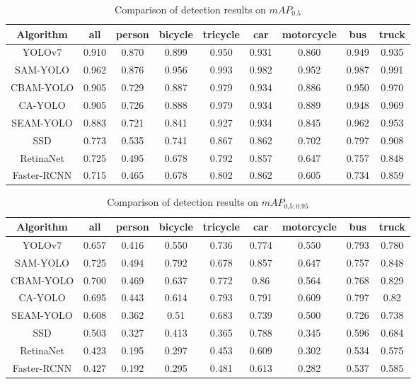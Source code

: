 \documentclass[aic]{iosart2x}
\begin{document}
\begin{table}[!htbp]
    \centering
    \caption{Comparison of detection results on $mAP_{0.5}$}
    \label{tab:comparative_experiment_ap_5}
    \begin{tabular}{ccccccccc}
        \toprule  
 Algorithm   & all   & person & bicycle & tricycle & car   & motorcycle & bus   & truck \\ \midrule  
 YOLOv7      & 0.910 & 0.870  & 0.899   & 0.950    & 0.931 & 0.860      & 0.949 & 0.935 \\
 SAM-YOLO    & 0.962 & 0.876  & 0.956   & 0.993    & 0.982 & 0.952      & 0.987 & 0.991 \\
 CBAM-YOLO   & 0.905 & 0.729  & 0.887   & 0.979    & 0.934 & 0.886      & 0.950 & 0.970 \\
 CA-YOLO     & 0.905 & 0.726  & 0.888   & 0.979    & 0.934 & 0.889      & 0.948 & 0.969 \\
 SEAM-YOLO   & 0.883 & 0.721  & 0.841   & 0.927    & 0.934 & 0.845      & 0.962 & 0.953 \\
 SSD         & 0.773 & 0.535  & 0.741   & 0.867    & 0.862 & 0.702      & 0.797 & 0.908 \\
 RetinaNet   & 0.725 & 0.495  & 0.678   & 0.792    & 0.857 & 0.647      & 0.757 & 0.848 \\ 
 Faster-RCNN & 0.715 & 0.465  & 0.678   & 0.802    & 0.862 & 0.605      & 0.734 & 0.859 \\ 
        \bottomrule
    \end{tabular}
\end{table}

\begin{table}[!htbp]
    \centering          
    \caption{Comparison of detection results on $mAP_{0.5:0.95}$}
    \label{tab:comparative_experiment_ap_95}
    \begin{tabular}{ccccccccc}
        \toprule  
 Algorithm   & all   & person & bicycle & tricycle & car   & motorcycle & bus   & truck \\ \midrule
 YOLOv7      & 0.657 & 0.416  & 0.550   & 0.736    & 0.774 & 0.550      & 0.793 & 0.780 \\
 SAM-YOLO    & 0.725 & 0.494  & 0.792   & 0.678    & 0.857 & 0.647      & 0.757 & 0.848 \\
 CBAM-YOLO   & 0.700 & 0.469  & 0.637   & 0.772    & 0.86  & 0.564      & 0.768 & 0.829 \\
 CA-YOLO     & 0.695 & 0.443  & 0.614   & 0.793    & 0.791 & 0.609      & 0.797 & 0.82  \\
 SEAM-YOLO   & 0.608 & 0.362  & 0.51    & 0.683    & 0.739 & 0.500      & 0.726 & 0.738 \\
 SSD         & 0.503 & 0.327  & 0.413   & 0.365    & 0.788 & 0.345      & 0.596 & 0.684 \\
 RetinaNet   & 0.423 & 0.195  & 0.297   & 0.453    & 0.609 & 0.302      & 0.534 & 0.575 \\ 
 Faster-RCNN & 0.427 & 0.192  & 0.295   & 0.481    & 0.613 & 0.282      & 0.537 & 0.585 \\  
        \bottomrule
    \end{tabular}
\end{table}
\end{document}
